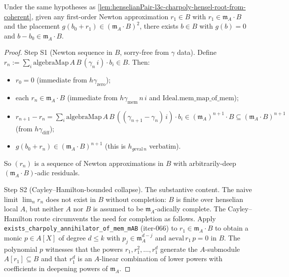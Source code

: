 \begin{lemma}
\label{lem:henselianPair-l3c-root-descent-from-mAB2}
Under the same hypotheses as
\cref{lem:henselianPair-l3c-charpoly-hensel-root-from-coherent},
given any first-order Newton approximation $r_1 \in B$ with
$r_1 \in \mathfrak m_A \cdot B$ and the placement
$g(b_0 + r_1) \in (\mathfrak m_A \cdot B)^2$, there exists
$b \in B$ with $g(b) = 0$ and $b - b_0 \in \mathfrak m_A \cdot B$.
\end{lemma}

\begin{proof}

\leanok
Step S1 (Newton sequence in $B$, sorry-free from $\gamma$ data).
Define $r_n := \sum_i \mathrm{algebraMap}\,A\,B\,(\gamma_n\,i)\cdot
b_i \in B$. Then:
\begin{itemize}
\item $r_0 = 0$ (immediate from $h\gamma_{\mathrm{zero}}$);
\item each $r_n \in \mathfrak m_A \cdot B$ (immediate from
  $h\gamma_{\mathrm{mem}}\,n\,i$ and $\mathrm{Ideal.mem\_map\_of\_mem}$);
\item $r_{n+1} - r_n = \sum_i \mathrm{algebraMap}\,A\,B\,
  ((\gamma_{n+1} - \gamma_n)\,i) \cdot b_i \in (\mathfrak m_A)^{n+1}
  \cdot B \subseteq (\mathfrak m_A \cdot B)^{n+1}$ (from
  $h\gamma_{\mathrm{diff}}$);
\item $g(b_0 + r_n) \in (\mathfrak m_A \cdot B)^{n+1}$ (this is
  $h_{g\mathrm{eval}\,n}$ verbatim).
\end{itemize}
So $(r_n)$ is a sequence of Newton approximations in $B$ with
arbitrarily-deep $(\mathfrak m_A \cdot B)$-adic residuals.

Step S2 (Cayley--Hamilton-bounded collapse). The substantive
content. The naive limit $\lim_n r_n$ does not exist in $B$
without completion: $B$ is finite over henselian local $A$, but
neither $A$ nor $B$ is assumed to be $\mathfrak m_A$-adically
complete. The Cayley--Hamilton route circumvents the need for
completion as follows. Apply
\texttt{exists\_charpoly\_annihilator\_of\_mem\_mAB} (iter-066)
to $r_1 \in \mathfrak m_A \cdot B$ to obtain a monic
$p \in A[X]$ of degree $d \le k$ with $p_j \in \mathfrak m_A^{d-j}$
and $\mathrm{aeval}\,r_1\,p = 0$ in $B$. The polynomial $p$
witnesses that the powers $r_1, r_1^2, \ldots, r_1^d$ generate
the $A$-submodule $A[r_1] \subseteq B$ and that $r_1^d$ is an
$A$-linear combination of lower powers with coefficients in
deepening powers of $\mathfrak m_A$.


\end{proof}
